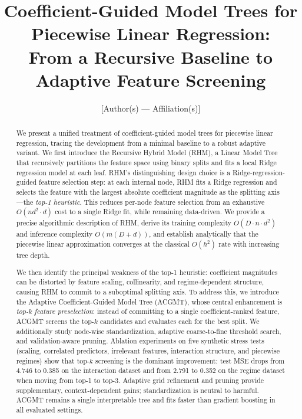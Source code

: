 \documentclass[11pt,a4paper]{article}
\title{Coefficient-Guided Model Trees for Piecewise Linear Regression:\\
From a Recursive Baseline to Adaptive Feature Screening}
\author{[Author(s) --- Affiliation(s)]}
\date{}
\begin{document}
\maketitle

\begin{abstract}
We present a unified treatment of coefficient-guided model trees for piecewise linear regression, tracing the development from a minimal baseline to a robust adaptive variant. We first introduce the Recursive Hybrid Model (RHM), a Linear Model Tree that recursively partitions the feature space using binary splits and fits a local Ridge regression model at each leaf. RHM's distinguishing design choice is a Ridge-regression-guided feature selection step: at each internal node, RHM fits a Ridge regression and selects the feature with the largest absolute coefficient magnitude as the splitting axis---the \emph{top-1 heuristic}. This reduces per-node feature selection from an exhaustive $O(nd^2 \cdot d)$ cost to a single Ridge fit, while remaining data-driven. We provide a precise algorithmic description of RHM, derive its training complexity $O(D \cdot n \cdot d^2)$ and inference complexity $O(m(D+d))$, and establish analytically that the piecewise linear approximation converges at the classical $O(h^2)$ rate with increasing tree depth.

We then identify the principal weakness of the top-1 heuristic: coefficient magnitudes can be distorted by feature scaling, collinearity, and regime-dependent structure, causing RHM to commit to a suboptimal splitting axis. To address this, we introduce the Adaptive Coefficient-Guided Model Tree (ACGMT), whose central enhancement is \emph{top-$k$ feature preselection}: instead of committing to a single coefficient-ranked feature, ACGMT screens the top-$k$ candidates and evaluates each for the best split. We additionally study node-wise standardization, adaptive coarse-to-fine threshold search, and validation-aware pruning. Ablation experiments on five synthetic stress tests (scaling, correlated predictors, irrelevant features, interaction structure, and piecewise regimes) show that top-$k$ screening is the dominant improvement: test MSE drops from 4.746 to 0.385 on the interaction dataset and from 2.791 to 0.352 on the regime dataset when moving from top-1 to top-3. Adaptive grid refinement and pruning provide supplementary, context-dependent gains; standardization is neutral to harmful. ACGMT remains a single interpretable tree and fits faster than gradient boosting in all evaluated settings.
\end{abstract}
\end{document}
